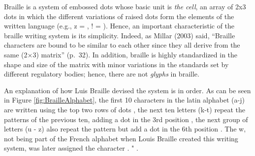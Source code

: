 \documentclass[english,man]{apa7}
\begin{document}
Braille is a system of embossed dots whose basic unit is \emph{the cell}, an array of 2x3 dots in which the different variations of raised dots form the elements of the written language (e.g., z = , ! = \braille{!}). Hence, an important characteristic of the braille writing system is its simplicity. Indeed, as Millar (2003) said, \enquote{Braille characters are bound to be similar to each other since they all derive from the same (2×3) matrix} (p.~32). In addition, braille is highly standardized in the shape and size of the matrix with minor variations in the standards set by different regulatory bodies; hence, there are not \emph{glyphs} in braille.

An explanation of how Luis Braille devised the system is in order. As can be seen in Figure \ref{fig:BrailleAlphabet}, the first 10 characters in the latin alphabet (a-j) are written using the top two rows of dots , the next ten letters (k-t) repeat the patterns of the previous ten, adding a dot in the 3rd position , the next group of letters (u - z) also repeat the pattern but add a dot in the 6th position . The w, not being part of the French alphabet when Louis Braille created this writing system, was later assigned the character . {\colorbox{darkyellow}{\sffamily\scriptsize\bfseries\color{white}{pga}}}{\sffamily\small\itshape{}}" .

{\colorbox{blue}{\sffamily\scriptsize\bfseries\color{white}{abl}}}{\sffamily\small\itshape\color{blue}{briefly what has been done regarding confusion matrices and letter perception}}

{\colorbox{blue}{\sffamily\scriptsize\bfseries\color{white}{abl}}}{\sffamily\small\itshape\color{blue}{confusion matrices: loomis, craigh}}

{\colorbox{blue}{\sffamily\scriptsize\bfseries\color{white}{abl}}}{\sffamily\small\itshape\color{blue}{letter perception: millar}}
\end{document}
